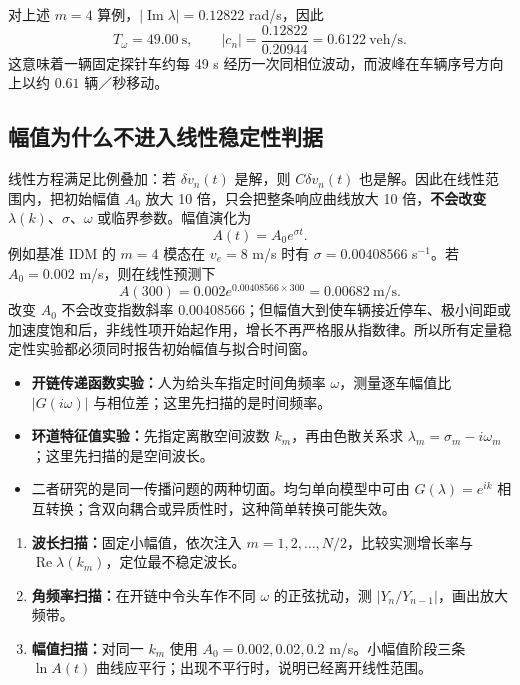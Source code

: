 \documentclass[11pt,a4paper,openany]{book}
\numberwithin{equation}{chapter}
\numberwithin{figure}{chapter}
\numberwithin{table}{chapter}
\begin{document}
对上述 $m=4$ 算例，$|\operatorname{Im}\lambda|=0.12822$ rad/s，因此
\begin{equation}
T_\omega=49.00\ \text{s},
\qquad
|c_n|=\frac{0.12822}{0.20944}=0.6122\ \text{veh/s}.
\end{equation}
这意味着一辆固定探针车约每 49 s 经历一次同相位波动，而波峰在车辆序号方向上以约 $0.61$ 辆／秒移动。

\subsection{幅值为什么不进入线性稳定性判据}

线性方程满足比例叠加：若 $\delta v_n(t)$ 是解，则 $C\delta v_n(t)$ 也是解。因此在线性范围内，把初始幅值 $A_0$ 放大 10 倍，只会把整条响应曲线放大 10 倍，\textbf{不会改变} $\lambda(k)$、$\sigma$、$\omega$ 或临界参数。幅值演化为
\begin{equation}
A(t)=A_0e^{\sigma t}.
\end{equation}
例如基准 IDM 的 $m=4$ 模态在 $v_e=8$ m/s 时有 $\sigma=0.00408566$ s$^{-1}$。若 $A_0=0.002$ m/s，则在线性预测下
\begin{equation}
A(300)=0.002e^{0.00408566\times300}=0.00682\ \text{m/s}.
\end{equation}
改变 $A_0$ 不会改变指数斜率 $0.00408566$；但幅值大到使车辆接近停车、极小间距或加速度饱和后，非线性项开始起作用，增长不再严格服从指数律。所以所有定量稳定性实验都必须同时报告初始幅值与拟合时间窗。

\begin{tcolorbox}[notebox,title=\textbf{开链扫频与环道模态扫描在“扫描什么”}]
\begin{itemize}[leftmargin=1.4em,itemsep=3pt]
\item \textbf{开链传递函数实验：}人为给头车指定时间角频率 $\omega$，测量逐车幅值比 $|G(i\omega)|$ 与相位差；这里先扫描的是时间频率。
\item \textbf{环道特征值实验：}先指定离散空间波数 $k_m$，再由色散关系求 $\lambda_m=\sigma_m-i\omega_m$；这里先扫描的是空间波长。
\item 二者研究的是同一传播问题的两种切面。均匀单向模型中可由 $G(\lambda)=e^{ik}$ 相互转换；含双向耦合或异质性时，这种简单转换可能失效。
\end{itemize}
\end{tcolorbox}

\begin{tcolorbox}[experimentbox,title=\textbf{建议的三组扰动特征实验}]
\begin{enumerate}[leftmargin=1.6em,itemsep=3pt]
\item \textbf{波长扫描：}固定小幅值，依次注入 $m=1,2,\ldots,N/2$，比较实测增长率与 $\operatorname{Re}\lambda(k_m)$，定位最不稳定波长。
\item \textbf{角频率扫描：}在开链中令头车作不同 $\omega$ 的正弦扰动，测 $|Y_n/Y_{n-1}|$，画出放大频带。
\item \textbf{幅值扫描：}对同一 $k_m$ 使用 $A_0=0.002,0.02,0.2$ m/s。小幅值阶段三条 $\ln A(t)$ 曲线应平行；出现不平行时，说明已经离开线性范围。
\end{enumerate}
\end{tcolorbox}
\end{document}
